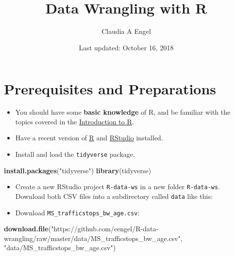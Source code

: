 \documentclass[]{book}
\title{Data Wrangling with R}
\author{Claudia A Engel}
\date{Last updated: October 16, 2018}
\newenvironment{Shaded}{\begin{snugshade}}{\end{snugshade}}
\newcommand{\KeywordTok}[1]{\textcolor[rgb]{0.13,0.29,0.53}{\textbf{#1}}}
\newcommand{\StringTok}[1]{\textcolor[rgb]{0.31,0.60,0.02}{#1}}
\newcommand{\NormalTok}[1]{#1}
\providecommand{\tightlist}{%
  \setlength{\itemsep}{0pt}\setlength{\parskip}{0pt}}
\theoremstyle{definition}
\theoremstyle{definition}
\theoremstyle{definition}
\theoremstyle{remark}
\begin{document}
\maketitle

{
\setcounter{tocdepth}{1}
\tableofcontents
}
\chapter*{Prerequisites and
Preparations}\label{prerequisites-and-preparations}

\begin{itemize}
\tightlist
\item
  You should have some \textbf{basic knowledge} of R, and be familiar
  with the topics covered in the
  \href{https://cengel.github.io/R-intro/}{Introduction to R}.
\item
  Have a recent version of \href{https://cran.r-project.org/}{R} and
  \href{https://www.rstudio.com/}{RStudio} installed.
\item
  Install and load the \texttt{tidyverse} package.
\end{itemize}

\begin{Shaded}
\begin{Highlighting}[]
\KeywordTok{install.packages}\NormalTok{(}\StringTok{"tidyverse"}\NormalTok{)  }
\KeywordTok{library}\NormalTok{(tidyverse)}
\end{Highlighting}
\end{Shaded}

\begin{itemize}
\tightlist
\item
  Create a new RStudio project \texttt{R-data-ws} in a new folder
  \texttt{R-data-ws}. Download both CSV files into a subdirectory called
  \texttt{data} like this:
\item
  Download \texttt{MS\_trafficstops\_bw\_age.csv}:
\end{itemize}

\begin{Shaded}
\begin{Highlighting}[]
\KeywordTok{download.file}\NormalTok{(}\StringTok{"https://github.com/cengel/R-data-wrangling/raw/master/data/MS_trafficstops_bw_age.csv"}\NormalTok{,}
              \StringTok{"data/MS_trafficstops_bw_age.csv"}\NormalTok{)}
\end{Highlighting}
\end{Shaded}
\end{document}
